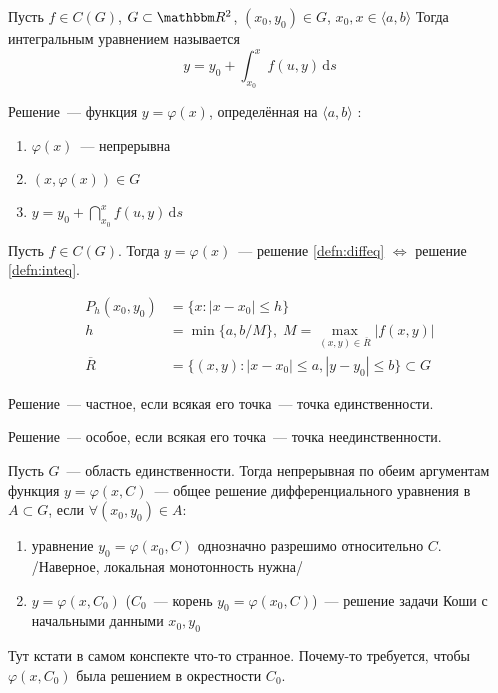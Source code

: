 \documentclass[10pt, timbord]{../notes}
\begin{document}
\begin{defn}\label{defn:inteq}
  Пусть $f\in C(G)$, $G\subset\R^2$, $(x_0, y_0) \in G$, $x_0, x\in \langle a, b \rangle$
  Тогда интегральным уравнением называется 
  \[
    y = y_0 + \int_{x_0}^{x} f(u, y)\, \mathrm d s
  \]
\end{defn}

\begin{defn}\label{defn:intsol}
  Решение~--- функция $y=\varphi(x)$, определённая на $\langle a, b \rangle$ :
  \begin{enumerate}
    \item $\varphi(x)$~--- непрерывна
    \item $(x, \varphi(x)) \in G$
    \item $ y = y_0 + \dint_{x_0}^{x} f(u, y)\, \mathrm d s $
  \end{enumerate}
\end{defn}

\begin{thrm}\label{thrm:diffinteqconnect}
  Пусть $f\in C(G)$. Тогда $y=\varphi(x)$~--- решение \ref{defn:diffeq} $\Leftrightarrow$ решение \ref{defn:inteq}.
\end{thrm}

\begin{defn}\label{defn:peanosegm}
  \begin{align*}
    P_h(x_0, y_0) &= \{x\colon |x-x_0| \leqslant h\} \\
    h &= \min \{a, b/M\},\; M = \max_{(x, y)\in \overline R} | f(x, y) | \\
    \overline R &= \{ (x, y) \colon |x-x_0| \leqslant a, | y-y_0| \leqslant b\} \subset G
  \end{align*}
\end{defn}

\begin{defn}\label{defn:partsol}
  Решение~--- частное, если всякая его точка~--- точка единственности.
\end{defn}

\begin{defn}\label{defn:singsol}
  Решение~--- особое, если всякая его точка~--- точка неединственности.
\end{defn}

\begin{defn}\label{defn:generalsol}
  Пусть $G$~--- область единственности. Тогда непрерывная по обеим аргументам функция $y = \varphi(x,C)$~--- общее решение 
  дифференциального уравнения в $A \subset G$, если $\forall (x_0, y_0) \in A $:
  \begin{enumerate}
    \item  уравнение $y_0 = \varphi(x_0, C)$ однозначно разрешимо относительно $C$. \\
      /Наверное, локальная монотонность нужна/
    \item $y=\varphi(x, C_0)$ ($C_0$~--- корень $y_0=\varphi(x_0, C)$)~--- решение задачи Коши с начальными данными $x_0, y_0$
  \end{enumerate}
  Тут кстати в самом конспекте что-то странное. Почему-то требуется, чтобы $\varphi(x,C_0)$ была решением в окрестности $C_0$.
\end{defn}
\end{document}

